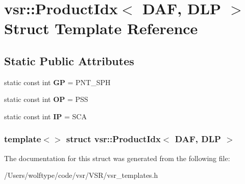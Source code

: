 \hypertarget{structvsr_1_1_product_idx_3_01_d_a_f_00_01_d_l_p_01_4}{\section{vsr\-:\-:Product\-Idx$<$ D\-A\-F, D\-L\-P $>$ Struct Template Reference}
\label{structvsr_1_1_product_idx_3_01_d_a_f_00_01_d_l_p_01_4}
}
\subsection*{Static Public Attributes}
\begin{DoxyCompactItemize}
\item 
\hypertarget{structvsr_1_1_product_idx_3_01_d_a_f_00_01_d_l_p_01_4_ac9d563367bc11de2c088b708608bf659}{static const int {\bfseries G\-P} = P\-N\-T\-\_\-\-S\-P\-H}\label{structvsr_1_1_product_idx_3_01_d_a_f_00_01_d_l_p_01_4_ac9d563367bc11de2c088b708608bf659}

\item 
\hypertarget{structvsr_1_1_product_idx_3_01_d_a_f_00_01_d_l_p_01_4_ace26f18091ebc207ca25a7cbe1f01192}{static const int {\bfseries O\-P} = P\-S\-S}\label{structvsr_1_1_product_idx_3_01_d_a_f_00_01_d_l_p_01_4_ace26f18091ebc207ca25a7cbe1f01192}

\item 
\hypertarget{structvsr_1_1_product_idx_3_01_d_a_f_00_01_d_l_p_01_4_a4cc01837312883715ffcf6a93e91635a}{static const int {\bfseries I\-P} = S\-C\-A}\label{structvsr_1_1_product_idx_3_01_d_a_f_00_01_d_l_p_01_4_a4cc01837312883715ffcf6a93e91635a}

\end{DoxyCompactItemize}
\subsubsection*{template$<$$>$ struct vsr\-::\-Product\-Idx$<$ D\-A\-F, D\-L\-P $>$}



The documentation for this struct was generated from the following file\-:\begin{DoxyCompactItemize}
\item 
/\-Users/wolftype/code/vsr/\-V\-S\-R/vsr\-\_\-templates.\-h\end{DoxyCompactItemize}
